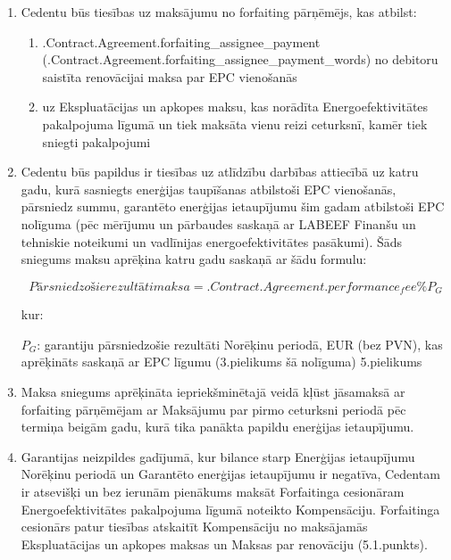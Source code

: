 \documentclass[a4paper]{article}
\begin{document}
\begin{enumerate}
\item{Cedentu būs tiesības uz maksājumu no forfaiting pārņēmējs, kas atbilst:}

  \begin{enumerate}
  \item{ \iffalse input forfaitingFields.forfaiting_assignee_payment value="{{.Contract.Agreement.forfaiting_assignee_payment}}" type="number" \fi {{.Contract.Agreement.forfaiting_assignee_payment}} (\iffalse input forfaitingFields.forfaiting_assignee_payment_words value="{{.Contract.Agreement.forfaiting_assignee_payment_words}}" \fi {{.Contract.Agreement.forfaiting_assignee_payment_words}})
no debitoru saistīta renovācijai maksa par EPC vienošanās}

  \item{uz Ekspluatācijas un apkopes maksu, kas norādīta Energoefektivitātes pakalpojuma
līgumā un tiek maksāta vienu reizi ceturksnī, kamēr tiek sniegti pakalpojumi}
  \end{enumerate}

\item{Cedentu būs papildus ir tiesības uz atlīdzību darbības attiecībā uz katru gadu, kurā sasniegts
enerģijas taupīšanas atbilstoši EPC vienošanās, pārsniedz summu, garantēto enerģijas
ietaupījumu šim gadam atbilstoši EPC nolīguma (pēc mērījumu un pārbaudes saskaņā ar LABEEF
Finanšu un tehniskie noteikumi un vadlīnijas energoefektivitātes pasākumi). Šāds sniegums
maksu aprēķina katru gadu saskaņā ar šādu formulu: \par

    \begin{center}
      \[Pārsniedzošie rezultāti maksa = \iffalse input forfaitingFields.performance_fee value="{{.Contract.Agreement.performance_fee}}" type="number" \fi {{.Contract.Agreement.performance_fee}}\% P_G\]
    \end{center}

    kur: \par
    $P_G$: garantiju pārsniedzošie rezultāti Norēķinu periodā, EUR (bez PVN), kas aprēķināts
saskaņā ar EPC līgumu (3.pielikums šā nolīguma) 5.pielikums}

\item{Maksa sniegums aprēķināta iepriekšminētajā veidā kļūst jāsamaksā ar forfaiting pārņēmējam ar
Maksājumu par pirmo ceturksni periodā pēc termiņa beigām gadu, kurā tika panākta papildu
enerģijas ietaupījumu.}

\item{Garantijas neizpildes gadījumā, kur bilance starp Enerģijas ietaupījumu Norēķinu periodā un
Garantēto enerģijas ietaupījumu ir negatīva, Cedentam ir atsevišķi un bez ierunām pienākums
maksāt Forfaitinga cesionāram Energoefektivitātes pakalpojuma līgumā noteikto Kompensāciju.
Forfaitinga cesionārs patur tiesības atskaitīt Kompensāciju no maksājamās Ekspluatācijas un
apkopes maksas un Maksas par renovāciju (5.1.punkts).}


\end{enumerate}
\end{document}
